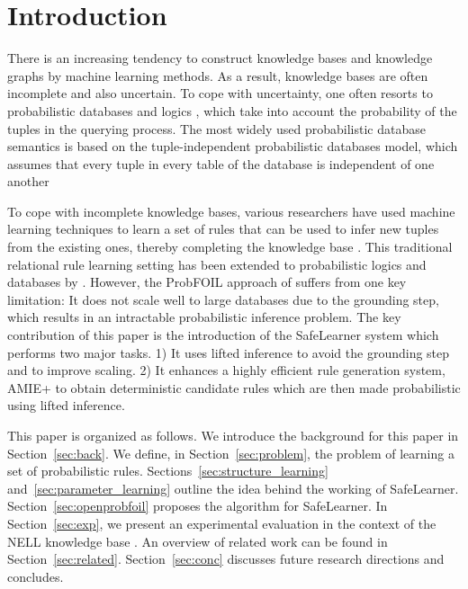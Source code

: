 \documentclass[akbc,twoside,11pt]{article}
\newcommand{\algorithmname}{SafeLearner\xspace}
\begin{document}
\section{Introduction}
\label{Introduction}
There is an increasing tendency to construct knowledge bases and knowledge graphs by machine learning methods. As a result, knowledge bases are often incomplete and also uncertain. To cope with uncertainty, one often resorts to probabilistic databases and logics \cite{DBLP:journals/ftdb/BroeckS17,2016Raedt}, which take into account the probability of the tuples in the querying process. The most widely used probabilistic database semantics is based on the tuple-independent probabilistic databases model, which assumes that every tuple in every table of the database is independent of one another

To cope with incomplete knowledge bases, various researchers have used machine learning techniques to learn a set of rules that can be used to infer new tuples from the existing ones, thereby completing the knowledge base \cite{NELL}. This traditional relational rule learning setting \cite{FOIL} has been extended to probabilistic logics and databases by \citet{DBLP:conf/ijcai/RaedtDTBV15}. However, the ProbFOIL approach of \citeauthor{DBLP:conf/ijcai/RaedtDTBV15} suffers from one key limitation: It does not scale well to large databases due to the grounding step, which results in an intractable probabilistic inference problem. The key contribution of this paper is the introduction of the \algorithmname system which performs two major tasks. 1) It uses lifted inference to avoid the grounding step and to improve scaling. 2) It enhances a highly efficient rule generation system, AMIE+ \cite{DBLP:journals/vldb/GalarragaTHS15} to obtain deterministic candidate rules which are then made probabilistic using lifted inference.

This paper is organized as follows. 
We introduce the background for this paper in Section~\ref{sec:back}.
We define, in Section~\ref{sec:problem}, the problem of learning a set of probabilistic rules.
Sections~\ref{sec:structure_learning} and~\ref{sec:parameter_learning} outline the idea behind the working of \algorithmname.
Section~\ref{sec:openprobfoil} proposes the algorithm for \algorithmname.
In Section~\ref{sec:exp}, we present an experimental evaluation in the context of the NELL knowledge base \cite{NELL}.
An overview of related work can be found in Section~\ref{sec:related}.
Section~\ref{sec:conc} discusses future research directions and concludes.
\end{document}
